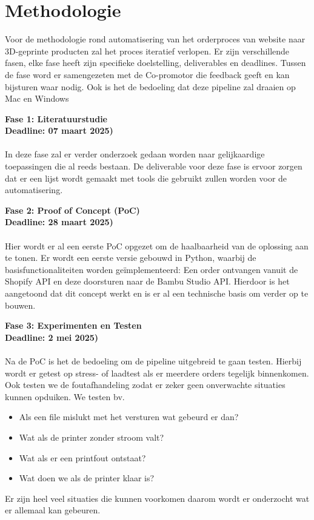 
\section{Methodologie}%
\label{sec:methodologie}

Voor de methodologie rond automatisering van het orderproces van website naar 3D-geprinte producten zal het proces iteratief verlopen. Er zijn verschillende fasen, elke fase heeft zijn specifieke doelstelling, deliverables en deadlines. Tussen de fase word er samengezeten met de Co-promotor die feedback geeft en kan bijsturen waar nodig. Ook is het de bedoeling dat deze pipeline zal draaien op Mac en Windows 
\vspace{2em}

\textbf{Fase 1: Literatuurstudie}\\
\textbf{Deadline: 07 maart 2025)}\\\\
In deze fase zal er verder onderzoek gedaan worden naar gelijkaardige toepassingen die al reeds bestaan. De deliverable voor deze fase is ervoor zorgen dat er een lijst wordt gemaakt met tools die gebruikt zullen worden voor de automatisering.
\vspace{2em}

\textbf{Fase 2: Proof of Concept (PoC)}\\
\textbf{Deadline: 28 maart 2025)}\\\\
Hier wordt er al een eerste PoC opgezet om de haalbaarheid van de oplossing aan te tonen. Er wordt een eerste versie gebouwd in Python, waarbij de basisfunctionaliteiten worden geïmplementeerd: Een order ontvangen vanuit de Shopify API en deze doorsturen naar de Bambu Studio API. Hierdoor is het aangetoond dat dit concept werkt en is er al een technische basis om verder op te bouwen.
\vspace{1em}

\textbf{Fase 3: Experimenten en Testen}\\
\textbf{Deadline: 2 mei 2025)}\\\\
Na de PoC is het de bedoeling om de pipeline uitgebreid te gaan testen. Hierbij wordt er getest op stress- of laadtest als er meerdere orders tegelijk binnenkomen. Ook testen we de foutafhandeling zodat er zeker geen onverwachte situaties kunnen opduiken. We testen bv.
\begin{itemize}
 \item Als een file mislukt met het versturen wat gebeurd er dan?
 \item Wat als de printer zonder stroom valt?
 \item Wat als er een printfout ontstaat?
 \item Wat doen we als de printer klaar is?
\end{itemize}
Er zijn heel veel situaties die kunnen voorkomen daarom wordt er onderzocht wat er allemaal kan gebeuren.
\vspace{1em}

